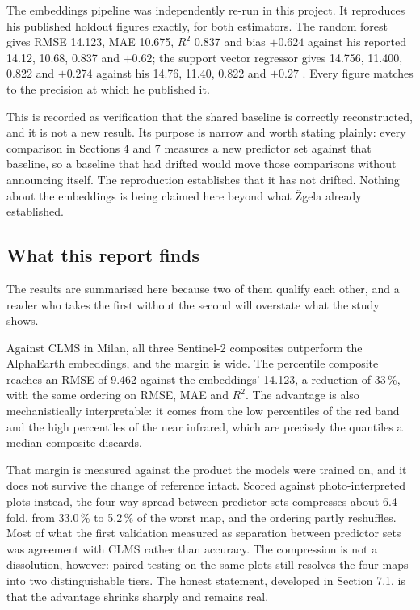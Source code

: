 \documentclass[11pt,a4paper]{article}
\newcommand{\Rsq}{$R^2$}
\begin{document}
The embeddings pipeline was independently re-run in this project. It reproduces
his published holdout figures exactly, for both estimators. The random forest
gives RMSE 14.123, MAE 10.675, \Rsq{} 0.837 and bias $+0.624$ against his reported
14.12, 10.68, 0.837 and $+0.62$; the support vector regressor gives 14.756,
11.400, 0.822 and $+0.274$ against his 14.76, 11.40, 0.822 and $+0.27$ \cite[p.~5]{zgela2026}.
Every figure matches to the precision at which he published it.

This is recorded as verification that the shared baseline is correctly
reconstructed, and it is not a new result. Its purpose is narrow and worth
stating plainly: every comparison in Sections 4 and 7 measures a new predictor
set against that baseline, so a baseline that had drifted would move those
comparisons without announcing itself. The reproduction establishes that it has
not drifted. Nothing about the embeddings is being claimed here beyond what
Žgela already established.

\subsection*{What this report finds}

The results are summarised here because two of them qualify each other, and a
reader who takes the first without the second will overstate what the study
shows.

Against CLMS in Milan, all three Sentinel-2 composites outperform the AlphaEarth
embeddings, and the margin is wide. The percentile composite reaches an RMSE of
9.462 against the embeddings' 14.123, a reduction of 33\,\%, with the same ordering
on RMSE, MAE and \Rsq{}. The advantage is also mechanistically interpretable: it
comes from the low percentiles of the red band and the high percentiles of the
near infrared, which are precisely the quantiles a median composite discards.

That margin is measured against the product the models were trained on, and it
does not survive the change of reference intact. Scored against photo-interpreted
plots instead, the four-way spread between predictor sets compresses about
6.4-fold, from 33.0\,\% to 5.2\,\% of the worst map, and the ordering partly
reshuffles.
Most of what the first validation measured as separation between predictor sets
was agreement with CLMS rather than accuracy. The compression is not a
dissolution, however: paired testing on the same plots still resolves the four
maps into two distinguishable tiers. The honest statement, developed in Section
7.1, is that the advantage shrinks sharply and remains real.
\end{document}
